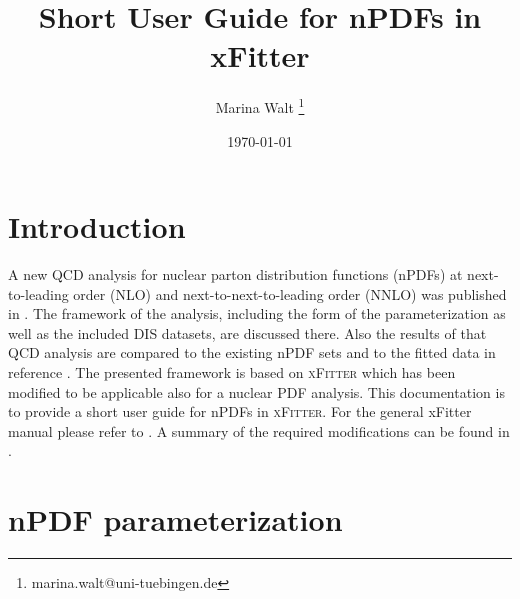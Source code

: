 \documentclass{article}
\title{Short User Guide for nPDFs in xFitter}
\author[1]{Marina Walt \thanks{marina.walt@uni-tuebingen.de}}
\affil[1]{Institute for Theoretical Physics, University of T\"ubingen, Auf der Morgenstelle 14, 72076 T\"ubingen, Germany}
\date{\today} %
\begin{document}
\maketitle
\tableofcontents


\section{Introduction}

A new QCD analysis for nuclear parton distribution functions (nPDFs) at next-to-leading order (NLO) and next-to-next-to-leading order (NNLO) was published in \cite{tuju19}. The framework of the analysis, including the form of the parameterization as well as the included DIS datasets, are discussed there. Also the results of that QCD analysis are compared to the existing nPDF sets and to the fitted data in reference \cite{tuju19}. The presented framework is based on \textsc{xFitter} \cite{xfitter-project,xfitter200} which has been modified to be applicable also for a nuclear PDF analysis. This documentation is to provide a short user guide for nPDFs in \textsc{xFitter}. For the general xFitter manual please refer to \cite{xfitter-manual}. A summary of the required modifications can be found in \cite{tuju19}.

\clearpage
\section{nPDF parameterization} 
\end{document}
